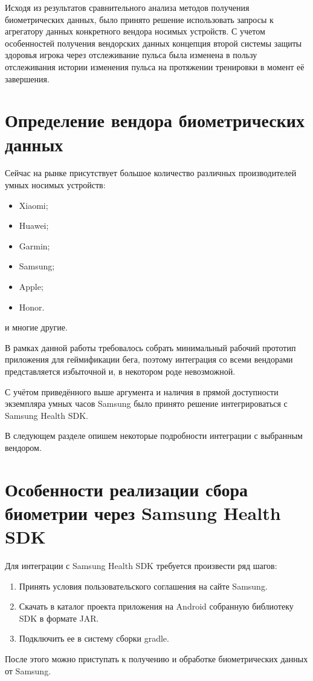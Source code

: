 Исходя из результатов сравнительного анализа методов получения биометрических данных, было принято решение использовать запросы к агрегатору данных конкретного вендора носимых устройств.
С учетом особенностей получения вендорских данных концепция второй системы защиты здоровья игрока через отслеживание пульса была изменена в пользу отслеживания истории изменения пульса на протяжении тренировки в момент её завершения.

\section{Определение вендора биометрических данных}
Сейчас на рынке присутствует большое количество различных производителей умных носимых устройств:
\begin{multicols}{2}
\begin{itemize}
	\item Xiaomi;
	\item Huawei;
	\item Garmin;
	\item Samsung;
	\item Apple;
	\item Honor.
\end{itemize}
\end{multicols}

и многие другие.


В рамках данной работы требовалось собрать минимальный рабочий прототип приложения для геймификации бега, поэтому интеграция со всеми вендорами представляется избыточной и, в некотором роде невозможной. 

С учётом приведённого выше аргумента и наличия в прямой доступности экземпляра умных часов Samsung было принято решение интегрироваться с Samsung Health SDK. 

В следующем разделе опишем некоторые подробности интеграции с выбранным вендором.

\section{Особенности реализации сбора биометрии через Samsung Health SDK}
Для интеграции с Samsung Health SDK требуется произвести ряд шагов:
\begin{enumerate}
	\item Принять условия пользовательского соглашения на сайте Samsung.
	\item Скачать в каталог проекта приложения на Android собранную библиотеку SDK в формате JAR.
	\item Подключить ее в систему сборки gradle.
\end{enumerate}
\smallskip
После этого можно приступать к получению и обработке биометрических данных от Samsung.


